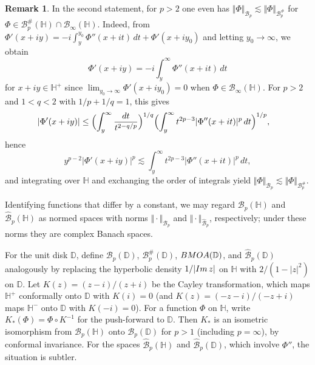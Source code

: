 \documentclass[amstex,12pt,reqno]{amsart}
\theoremstyle{definition}
\newtheorem{remark}{Remark}
\begin{document}
\begin{remark}
In the second statement, for $p>2$ one even has
$\Vert \Phi \Vert_{{\mathcal B}_p} \lesssim \Vert \Phi \Vert_{{\mathcal B}_p^{\#}}$ for
$\Phi \in {\mathcal B}_p^{\#}(\mathbb H) \cap {\mathcal B}_\infty(\mathbb H)$. Indeed,
from
$\Phi'(x+iy)=-i\int_{y}^{y_0} \Phi''(x+it)\,dt+\Phi'(x+iy_0)$ 
and letting $y_0 \to \infty$, we obtain
\begin{equation}\label{int-infty}
\Phi'(x+iy)=-i\int_{y}^{\infty} \Phi''(x+it)\,dt
\end{equation} 
for $x+iy \in \mathbb H^+$
since $\lim_{y_0 \to \infty} \Phi'(x+iy_0)=0$ when $\Phi \in \mathcal B_\infty(\mathbb H)$.
For $p>2$ and $1<q<2$ with $1/p+1/q=1$, this gives
\begin{align*}
|\Phi'(x+iy)| 
&\leq\Bigl(\int_y^\infty \frac{dt}{t^{2-q/p}} \Bigr)^{1/q}\Bigl(\int_y^\infty  t^{2p-3}|\Phi''(x+it)|^p\,dt\Bigr)^{1/p},
\end{align*}
hence 
$$
y^{p-2}|\Phi'(x+iy)|^p \lesssim \int_y^\infty  t^{2p-3}|\Phi''(x+it)|^p\,dt,
$$
and integrating over $\mathbb H$ and exchanging the order of integrals yield $\Vert \Phi \Vert_{{\mathcal B}_p}\lesssim \Vert \Phi \Vert_{{\mathcal B}_p^{\#}}$.
\end{remark}

Identifying functions that differ by a constant, we may regard ${\mathcal B}_p(\mathbb H)$ and $\widehat{\mathcal B}_p(\mathbb H)$ 
as normed spaces with norms $\Vert \cdot\Vert_{{\mathcal B}_p}$ and $\Vert \cdot\Vert_{\widehat{\mathcal B}_p}$,
respectively; under these norms they are complex Banach spaces.

For the unit disk $\mathbb D$, define ${\mathcal B}_p(\mathbb D)$, ${\mathcal B}_p^{\#}(\mathbb D)$, ${\rm BMOA}(\mathbb D)$,
and $\widehat{\mathcal B}_p(\mathbb D)$ analogously by replacing the
hyperbolic density $1/|{\rm Im}\,z|$ on $\mathbb H$ with $2/(1-|z|^2)$ on $\mathbb D$. 
Let $K(z)=(z-i)/(z+i)$ be the Cayley transformation, which maps
$\mathbb H^+$ conformally onto $\mathbb D$ with $K(i)=0$
(and $K(z)=(-z-i)/(-z+i)$ maps $\mathbb H^-$ onto $\mathbb D$ with $K(-i)=0$).
For a function $\Phi$ on $\mathbb H$, write $K_*(\Phi)=\Phi \circ K^{-1}$ for the push-forward to $\mathbb D$.
Then $K_*$ is an isometric isomorphism from
${\mathcal B}_p(\mathbb H)$ onto ${\mathcal B}_p(\mathbb D)$ for $p>1$ (including $p=\infty$),
by conformal invariance.
For the spaces $\widehat{\mathcal B}_p(\mathbb H)$ and $\widehat{\mathcal B}_p(\mathbb D)$,
which involve $\Phi''$, the situation is subtler.
\end{document}
